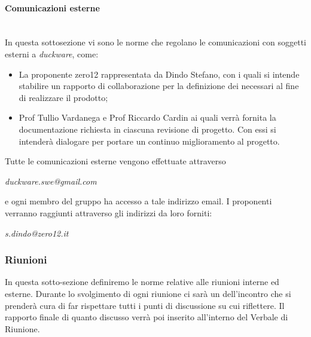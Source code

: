\paragraph{Comunicazioni esterne}\mbox{}\\[0.4cm]
In questa sottosezione vi sono le norme che regolano le comunicazioni con soggetti esterni a \emph{duckware}, come:
\begin{itemize}    
    \item La proponente zero12 rappresentata da Dindo Stefano, con i quali si intende stabilire un rapporto di collaborazione per la definizione dei  necessari al fine di realizzare il prodotto;
    \item Prof Tullio Vardanega e Prof Riccardo Cardin ai quali verrà fornita la documentazione richiesta in ciascuna revisione di progetto. Con essi si intenderà dialogare per portare un continuo miglioramento al progetto.
\end{itemize}
Tutte le comunicazioni esterne vengono effettuate attraverso
\begin{center}
\emph{duckware.swe@gmail.com}
\end{center}
e ogni membro del gruppo ha accesso a tale indirizzo email. I proponenti verranno raggiunti attraverso gli indirizzi da loro forniti:
\begin{center}
\emph{s.dindo@zero12.it}
\end{center}

\subsubsection{Riunioni}
In questa sotto-sezione definiremo le norme relative alle riunioni interne ed esterne. Durante lo svolgimento di ogni riunione ci sarà un  dell’incontro che si prenderà cura di far rispettare tutti i punti di discussione su cui riflettere. Il rapporto finale di quanto discusso verrà poi inserito all’interno del Verbale di Riunione. 

